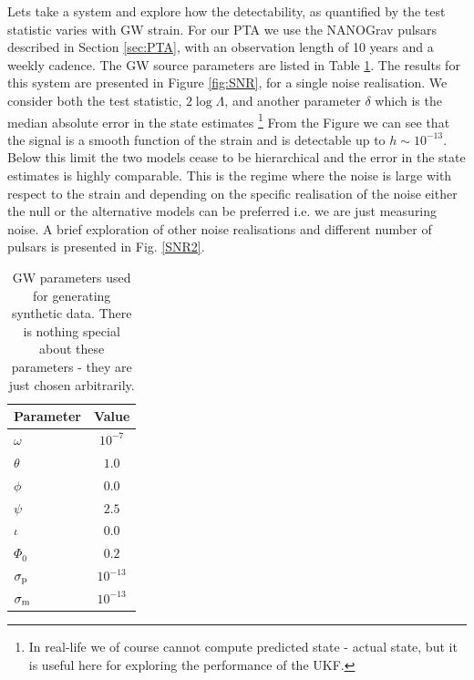 \documentclass{tufte-handout} %
\begin{document}
Lets take a system and explore how the detectability, as quantified by the test statistic varies with GW strain. For our PTA we use the NANOGrav pulsars described in Section \ref{sec:PTA}, with an observation length of 10 years and a weekly cadence. The GW source parameters are listed in Table \ref{tab:toy_example_parameters}. The results for this system are presented in Figure \ref{fig:SNR}, for a single noise realisation. We consider both the test statistic, $2 \log \Lambda$, and another parameter $\delta$ which is the median absolute error in the state estimates \footnote{In real-life we of course cannot compute predicted state - actual state, but it is useful here for exploring the performance of the UKF.} From the Figure we can see that the signal is a smooth function of the strain and is detectable up to $h \sim 10^{-13}$. Below this limit the two models cease to be hierarchical and the error in the state estimates is highly comparable. This is the regime where the noise is large with respect to the strain and depending on the specific realisation of the noise either the null or the alternative models can be preferred i.e. we are just measuring noise. A brief exploration of other noise realisations and different number of pulsars is presented in Fig. \ref{SNR2}.

 \begin{table}
	\centering
	\begin{tabular}{lc}
		Parameter & Value  \\
		\hline
		$\omega$       & $10^{-7}$  \\
		$\theta$          & $1.0$  \\
		$\phi$              & $0.0$   \\
		$\psi$              & $2.5$  \\
		$\iota$             & $0.0$  \\
		$\Phi_0$          & $0.2$  \\
		$\sigma_{\rm p}$ & $10^{-13}$ \\
		$\sigma_{\rm m}$ & $10^{-13}$ \\
		\hline
	\end{tabular}
	\caption{GW parameters used for generating synthetic data. There is nothing special about these parameters - they are just chosen arbitrarily.}
	\label{tab:toy_example_parameters}
\end{table}
\end{document}
